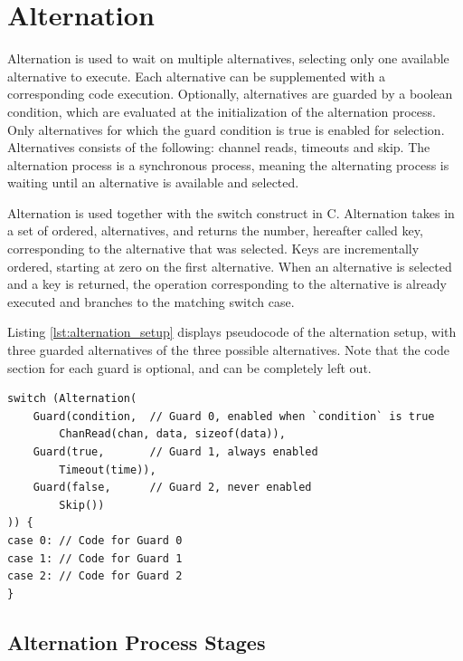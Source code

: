 \section{Alternation}

Alternation is used to wait on multiple alternatives, selecting only one available alternative to execute. Each alternative can be supplemented with a corresponding code execution. Optionally, alternatives are guarded by a boolean condition, which are evaluated at the initialization of the alternation process. Only alternatives for which the guard condition is true is enabled for selection. Alternatives consists of the following: channel reads, timeouts and skip. The alternation process is a synchronous process, meaning the alternating process is waiting until an alternative is available and selected. 

Alternation is used together with the switch construct in C. Alternation takes in a set of ordered, alternatives, and returns the number, hereafter called key, corresponding to the alternative that was selected. Keys are incrementally ordered, starting at zero on the first alternative. When an alternative is selected and a key is returned, the operation corresponding to the alternative is already executed and branches to the matching switch case. 

Listing \ref{lst:alternation_setup} displays pseudocode of the alternation setup, with three guarded alternatives of the three possible alternatives. Note that the code section for each guard is optional, and can be completely left out.

\noindent\begin{minipage}{\textwidth}
\begin{lstlisting}[style=CustomC,caption={Pseudocode of alternation setup},label={lst:alternation_setup}]
switch (Alternation(
	Guard(condition,  // Guard 0, enabled when `condition` is true
		ChanRead(chan, data, sizeof(data)),
	Guard(true,       // Guard 1, always enabled
		Timeout(time)),
	Guard(false,      // Guard 2, never enabled
		Skip())
)) {
case 0: // Code for Guard 0
case 1: // Code for Guard 1
case 2: // Code for Guard 2
}
\end{lstlisting}
\end{minipage}


\subsection{Alternation Process Stages}
\label{subsec:alternation_process_stages}

